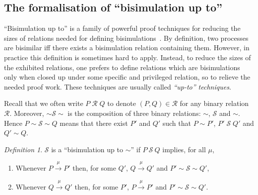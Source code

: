 \documentclass[GCNS]{yincog}
\theoremstyle{remark}
\newtheorem{definition}{Definition}[section]
\theoremstyle{theorem}
\theoremstyle{remark}
\def\Rvtex{\mathcal{R}}
\def\Svtex{\mathcal{S}}
\begin{document}
\subsection{The formalisation of ``bisimulation up to''}
 \label{sec4.6}

``Bisimulation up to'' is a family of powerful proof techniques for reducing
the sizes of relations needed for defining bisimulations~\cite{PousS19}.
By definition, two processes are bisimilar iff there exists a bisimulation
relation containing them. However, in practice this definition is sometimes
hard to apply. Instead, to reduce the sizes of the exhibited relations,
one prefers to define relations which are bisimulations only when closed
up under some specific and privileged relation, so to relieve the needed
proof work. These techniques are usually called
\emph{``up-to'' techniques}.

Recall that we often write $P \;\Rvtex \; Q$ to denote
$(P, Q) \in \Rvtex $ for any binary relation $\Rvtex $. Moreover,
$\sim \mathcal{S} \sim $ is the composition of three binary relations:
$\sim $, $\Svtex $ and $\sim $. Hence $P \sim \Svtex \sim Q$ means that
there exist $P'$ and $Q'$ such that $P \sim P'$, $P' \;\Svtex \; Q'$ and
$Q' \sim Q$.
%
\begin{definition}%
 \label{def:bisimUptoSim}
$\Svtex $ is a ``bisimulation up to $\sim $'' if $P\ \Svtex \ Q$ implies,
for all $\mu $,
%
\begin{enumerate}
%
\item Whenever $P \overset{\mu}{\rightarrow} P'$ then, for some $Q'$,
$Q \overset{\mu}{\rightarrow} Q'$ and $P' \sim \Svtex \sim Q'$,
%
\item Whenever $Q \overset{\mu}{\rightarrow} Q'$ then, for some $P'$,
$P \overset{\mu}{\rightarrow} P'$ and $P' \sim \Svtex \sim Q'$.
%
\end{enumerate}
%
\end{definition}
\end{document}
